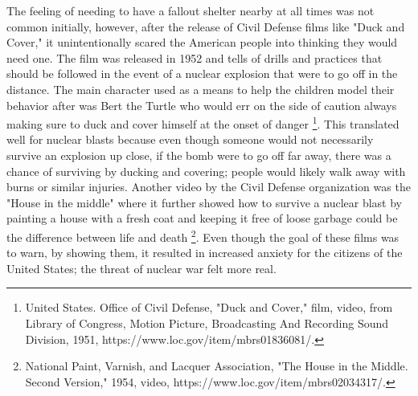 \documentclass[12pt]{turabian-researchpaper}
\begin{document}
The feeling of needing to have a fallout shelter nearby at all times was not common initially, however, after the release of Civil Defense films like "Duck and Cover," it unintentionally scared the American people into thinking they would need one. The film was released in 1952 and tells of drills and practices that should be followed in the event of a nuclear explosion that were to go off in the distance. The main character used as a means to help the children model their behavior after was Bert the Turtle who would err on the side of caution always making sure to duck and cover himself at the onset of danger \footnote{United States. Office of Civil Defense, "Duck and Cover," film, video, from Library of Congress, Motion Picture, Broadcasting And Recording Sound Division, 1951, https://www.loc.gov/item/mbrs01836081/.}. This translated well for nuclear blasts because even though someone would not necessarily survive an explosion up close, if the bomb were to go off far away, there was a chance of surviving by ducking and covering; people would likely walk away with burns or similar injuries. Another video by the Civil Defense organization was the "House in the middle" where it further showed how to survive a nuclear blast by painting a house with a fresh coat and keeping it free of loose garbage could be the difference between life and death \footnote{National Paint, Varnish, and Lacquer Association, "The House in the Middle. Second Version," 1954, video, https://www.loc.gov/item/mbrs02034317/.}. Even though the goal of these films was to warn, by showing them, it resulted in increased anxiety for the citizens of the United States; the threat of nuclear war felt more real. 
\end{document}
